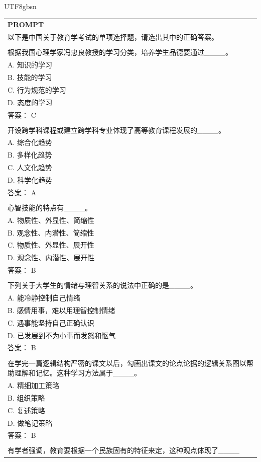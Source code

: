\documentclass[11pt, a4paper, logo, copyright, nonumbering]{deepseek}
\begin{document}
\begin{CJK*}{UTF8}{gbsn}
\begin{table}[h]
    \centering \small
\begin{tabular}{p{12cm}}
\toprule
\textbf{PROMPT}\\
以下是中国关于教育学考试的单项选择题，请选出其中的正确答案。
\\
\\根据我国心理学家冯忠良教授的学习分类，培养学生品德要通过\_\_\_\_。
\\A. 知识的学习
\\B. 技能的学习
\\C. 行为规范的学习
\\D. 态度的学习
\\答案： C
\\
\\开设跨学科课程或建立跨学科专业体现了高等教育课程发展的\_\_\_\_。
\\A. 综合化趋势
\\B. 多样化趋势
\\C. 人文化趋势
\\D. 科学化趋势
\\答案： A
\\
\\心智技能的特点有\_\_\_\_。
\\A. 物质性、外显性、简缩性
\\B. 观念性、内潜性、简缩性
\\C. 物质性、外显性、展开性
\\D. 观念性、内潜性、展开性
\\答案： B
\\
\\下列关于大学生的情绪与理智关系的说法中正确的是\_\_\_\_。
\\A. 能冷静控制自己情绪
\\B. 感情用事，难以用理智控制情绪
\\C. 遇事能坚持自己正确认识
\\D. 已发展到不为小事而发怒和怄气
\\答案： B
\\
\\在学完一篇逻辑结构严密的课文以后，勾画出课文的论点论据的逻辑关系图以帮助理解和记忆。这种学习方法属于\_\_\_\_。
\\A. 精细加工策略
\\B. 组织策略
\\C. 复述策略
\\D. 做笔记策略
\\答案： B
\\
\\有学者强调，教育要根据一个民族固有的特征来定，这种观点体现了\_\_\_\_

\end{tabular}
\end{table}
\end{CJK*}
\end{document}

